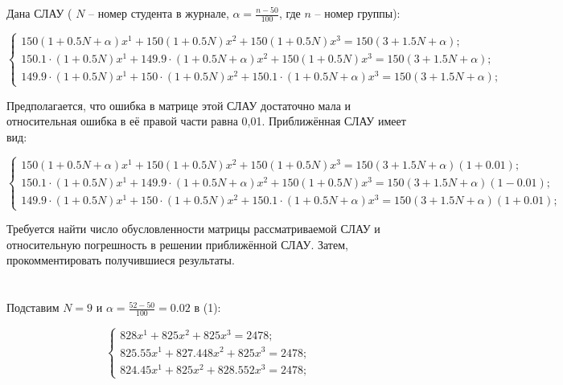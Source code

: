 \documentclass[a4paper, 12pt]{extarticle}
\begin{document}
Дана СЛАУ ( $N$ – номер студента в журнале, $\alpha = \frac{n - 50}{100}$, где $n$ – номер группы):

\begin{equation}
    \begin{cases}
        150(1 + 0.5 N + \alpha)x^1 + 150(1 + 0.5 N)x^2 + 150(1 + 0.5N)x^3 = 150(3 + 1.5N + \alpha);\\
        150.1 \cdot (1 + 0.5 N)x^1 + 149.9 \cdot (1 + 0.5 N + \alpha)x^2 + 150(1 + 0.5N)x^3 = 150(3 + 1.5 N + \alpha);\\
        149.9 \cdot (1 + 0.5N)x^1 + 150 \cdot (1 + 0.5 N)x^2 + 150.1 \cdot (1 + 0.5 N + \alpha)x^3 = 150 (3 + 1.5 N + \alpha);
    \end{cases}
\end{equation}

Предполагается, что ошибка в матрице этой СЛАУ достаточно мала и относительная
ошибка в её правой части равна 0,01. Приближённая СЛАУ имеет вид:

\begin{equation}
    \begin{cases}
        150(1 + 0.5 N + \alpha)x^1 + 150(1 + 0.5 N)x^2 + 150(1 + 0.5N)x^3 = 150(3 + 1.5N + \alpha)(1 + 0.01);\\
        150.1 \cdot (1 + 0.5 N)x^1 + 149.9 \cdot (1 + 0.5 N + \alpha)x^2 + 150(1 + 0.5N)x^3 = 150(3 + 1.5 N + \alpha)(1 - 0.01);\\
        149.9 \cdot (1 + 0.5N)x^1 + 150 \cdot (1 + 0.5 N)x^2 + 150.1 \cdot (1 + 0.5 N + \alpha)x^3 = 150 (3 + 1.5 N + \alpha)(1 + 0.01);
    \end{cases}
\end{equation}

Требуется найти число обусловленности матрицы рассматриваемой СЛАУ и
относительную погрешность в решении приближённой СЛАУ. Затем, прокомментировать
получившиеся результаты.

\section*{}

Подставим $N = 9$ и $\alpha = \frac{52 - 50}{100} = 0.02$ в (1):

\begin{equation}
    \begin{cases}
        828x^1 + 825x^2 + 825x^3 = 2478;\\
        825.55x^1 + 827.448x^2 + 825x^3 = 2478;\\
        824.45x^1 + 825x^2 + 828.552x^3 = 2478;
    \end{cases}
\end{equation}
\end{document}
